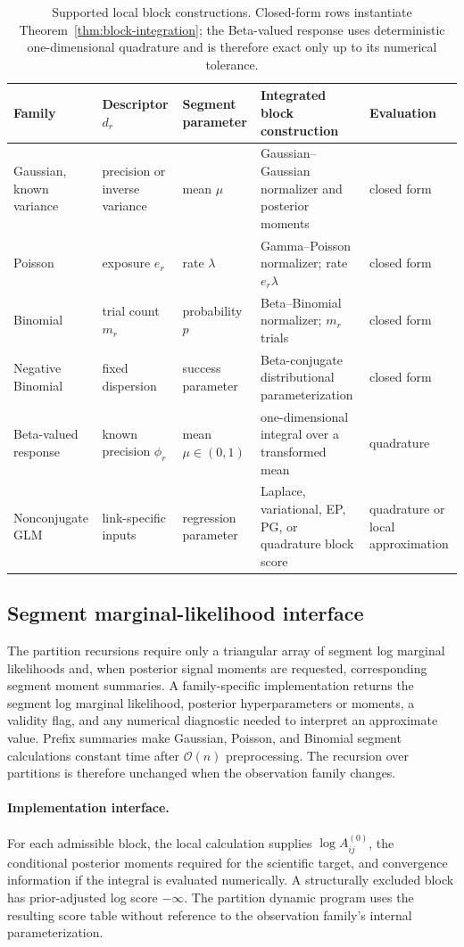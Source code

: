 \begin{table}[!htbp]
\centering
\small
\caption{Supported local block constructions. Closed-form rows instantiate Theorem~\ref{thm:block-integration}; the Beta-valued response uses deterministic one-dimensional quadrature and is therefore exact only up to its numerical tolerance.}
\label{tab:block-families}
\begin{tabularx}{0.97\textwidth}{@{}L{0.15\textwidth}L{0.19\textwidth}L{0.17\textwidth}Y L{0.16\textwidth}@{}}
\toprule
Family & Descriptor $d_r$ & Segment parameter & Integrated block construction & Evaluation \\
\midrule
Gaussian, known variance & precision or inverse variance & mean $\mu$ & Gaussian--Gaussian normalizer and posterior moments & closed form \\
Poisson & exposure $e_r$ & rate $\lambda$ & Gamma--Poisson normalizer; rate $e_r\lambda$ & closed form \\
Binomial & trial count $m_r$ & probability $p$ & Beta--Binomial normalizer; $m_r$ trials & closed form \\
Negative Binomial & fixed dispersion & success parameter & Beta-conjugate distributional parameterization & closed form \\
Beta-valued response & known precision $\phi_r$ & mean $\mu\in(0,1)$ & one-dimensional integral over a transformed mean & quadrature \\
Nonconjugate GLM & link-specific inputs & regression parameter & Laplace, variational, EP, PG, or quadrature block score & quadrature or local approximation \\
\bottomrule
\end{tabularx}
\end{table}

\subsection{Segment marginal-likelihood interface}
The partition recursions require only a triangular array of segment log marginal likelihoods and, when posterior signal moments are requested, corresponding segment moment summaries. A family-specific implementation returns the segment log marginal likelihood, posterior hyperparameters or moments, a validity flag, and any numerical diagnostic needed to interpret an approximate value. Prefix summaries make Gaussian, Poisson, and Binomial segment calculations constant time after $\mathcal O(n)$ preprocessing. The recursion over partitions is therefore unchanged when the observation family changes.

\paragraph{Implementation interface.}
For each admissible block, the local calculation supplies
$\log A^{(0)}_{ij}$, the conditional posterior moments required for the
scientific target, and convergence information if the integral is evaluated
numerically. A structurally excluded block has prior-adjusted log score
$-\infty$. The partition dynamic program uses the resulting score table
without reference to the observation family's internal parameterization.
